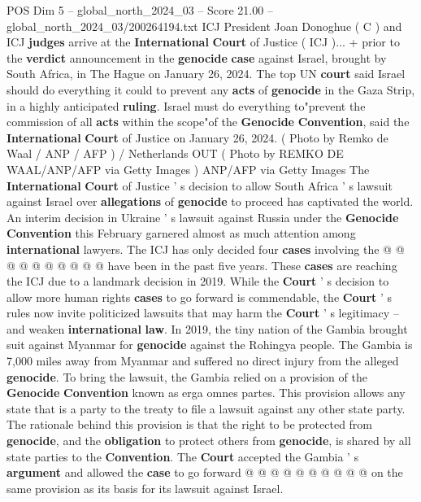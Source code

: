 \begin{textsample}{POS Dim 5 – global\_north\_2024\_03 – Score 21.00 – global\_north\_2024\_03/200264194.txt}  \label{ex:f5_pos_291}
ICJ President Joan Donoghue ( C ) and ICJ \textbf{judges} arrive at the \textbf{International} \textbf{Court} of Justice ( ICJ )... + prior to the \textbf{verdict} announcement in the \textbf{genocide} \textbf{case} against Israel, brought by South Africa, in The Hague on January 26, 2024.
The top UN \textbf{court} said Israel should do everything it could to prevent any \textbf{acts} of \textbf{genocide} in the Gaza Strip, in a highly anticipated \textbf{ruling}.
Israel must do everything to"prevent the commission of all \textbf{acts} within the scope"of the \textbf{Genocide} \textbf{Convention}, said the \textbf{International} \textbf{Court} of Justice on January 26, 2024. ( Photo by Remko de Waal / ANP / AFP ) / Netherlands OUT ( Photo by REMKO DE WAAL/ANP/AFP via Getty Images ) ANP/AFP via Getty Images The \textbf{International} \textbf{Court} of Justice ' s decision to allow South Africa ' s lawsuit against Israel over \textbf{allegations} of \textbf{genocide} to proceed has captivated the world.
An interim decision in Ukraine ' s lawsuit against Russia under the \textbf{Genocide} \textbf{Convention} this February garnered almost as much attention among \textbf{international} lawyers.
The ICJ has only decided four \textbf{cases} involving the @ @ @ @ @ @ @ @ @ @ have been in the past five years.
These \textbf{cases} are reaching the ICJ due to a landmark decision in 2019.
While the \textbf{Court} ' s decision to allow more human rights \textbf{cases} to go forward is commendable, the \textbf{Court} ' s rules now invite politicized lawsuits that may harm the \textbf{Court} ' s legitimacy -- and weaken \textbf{international} \textbf{law}.
In 2019, the tiny nation of the Gambia brought suit against Myanmar for \textbf{genocide} against the Rohingya people.
The Gambia is 7,000 miles away from Myanmar and suffered no direct injury from the alleged \textbf{genocide}.
To bring the lawsuit, the Gambia relied on a provision of the \textbf{Genocide} \textbf{Convention} known as erga omnes partes.
This provision allows any state that is a party to the treaty to file a lawsuit against any other state party.
The rationale behind this provision is that the right to be protected from \textbf{genocide}, and the \textbf{obligation} to protect others from \textbf{genocide}, is shared by all state parties to the \textbf{Convention}.
The \textbf{Court} accepted the Gambia ' s \textbf{argument} and allowed the \textbf{case} to go forward @ @ @ @ @ @ @ @ @ @ on the same provision as its basis for its lawsuit against Israel.

\end{textsample}
